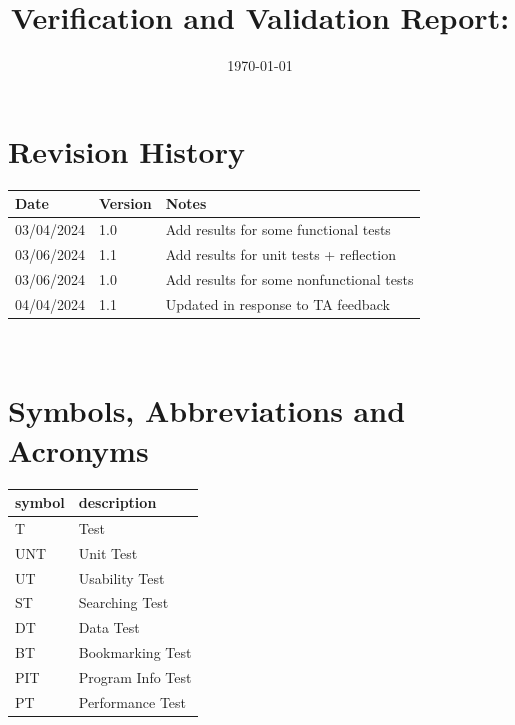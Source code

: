 \documentclass[12pt, titlepage]{article}
\begin{document}
\title{Verification and Validation Report: \progname}
\author{\authname}
\date{\today}

\maketitle


\section{Revision History}

\begin{tabularx}{\textwidth}{p{3cm}p{2cm}X}
  \toprule {\bf Date} & {\bf Version} & {\bf Notes}                              \\
  \midrule
  03/04/2024          & 1.0           & Add results for some functional tests    \\
  03/06/2024          & 1.1           & Add results for unit tests + reflection  \\
  03/06/2024          & 1.0           & Add results for some nonfunctional tests \\
  04/04/2024          & 1.1           & Updated in response to TA feedback \\
  \bottomrule
\end{tabularx}

~\newpage

\section{Symbols, Abbreviations and Acronyms}

\renewcommand{\arraystretch}{1.2}
\begin{tabular}{l l}
  \toprule
  \textbf{symbol} & \textbf{description} \\
  \midrule
  T               & Test                 \\
  UNT             & Unit Test            \\
  UT              & Usability Test       \\
  ST              & Searching Test       \\
  DT              & Data Test            \\
  BT              & Bookmarking Test     \\
  PIT             & Program Info Test    \\
  PT              & Performance Test     \\
  \bottomrule
\end{tabular}\\
\end{document}
